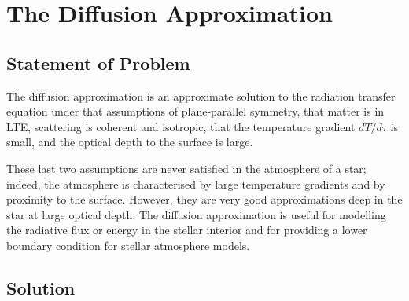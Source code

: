 \newslide

\section{The Diffusion Approximation}
\label{chapter-diffusion-approximation}

\subsection{Statement of Problem}

The diffusion approximation is an approximate solution to
the radiation transfer equation under that assumptions of plane-parallel symmetry, that matter is
in LTE, scattering is coherent and isotropic, that 
the temperature gradient $dT/d\tau$ is small, and the optical depth to the surface is large.

These last two assumptions are never satisfied in the atmosphere of a
star; indeed, the atmosphere is characterised by large
temperature gradients and by proximity to the surface. 
However, they
are very good approximations deep in the star at large
optical depth. The diffusion approximation is useful for
modelling the radiative flux or energy in the stellar interior and for
providing a lower boundary condition for stellar atmosphere
models.

\newslide

\subsection{Solution}

